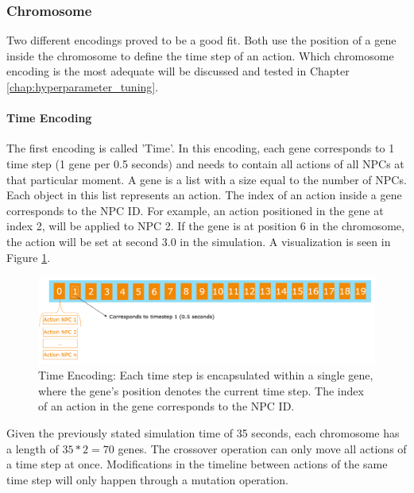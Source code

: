 \subsubsection{Chromosome}
Two different encodings proved to be a good fit. Both use the position of a gene inside the chromosome to define the time step of an action. Which chromosome encoding is the most adequate will be discussed and tested in Chapter \ref{chap:hyperparameter_tuning}.

\paragraph{Time Encoding}
The first encoding is called 'Time'. In this encoding, each gene corresponds to 1 time step (1 gene per 0.5 seconds) and needs to contain all actions of all NPCs at that particular moment. A gene is a list with a size equal to the number of NPCs. Each object in this list represents an action. The index of an action inside a gene corresponds to the NPC ID. For example, an action positioned in the gene at index 2, will be applied to NPC 2. If the gene is at position 6 in the chromosome, the action will be set at second 3.0 in the simulation. A visualization is seen in Figure \ref{fig:implementation:encoding_chromosome_time}.

\begin{figure}[ht] 
	\includegraphics[width=1\linewidth]{figures/time_encoding}
	\caption{Time Encoding: Each time step is encapsulated within a single gene, where the gene's position denotes the current time step. The index of an action in the gene corresponds to the NPC ID.}
	\label{fig:implementation:encoding_chromosome_time}
\end{figure}

Given the previously stated simulation time of 35 seconds, each chromosome has a length of $35 * 2 = 70$ genes. The crossover operation can only move all actions of a time step at once. Modifications in the timeline between actions of the same time step will only happen through a mutation operation.

